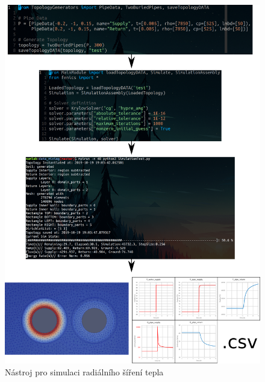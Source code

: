 \begin{figure}[h!]
\begin{center}
  \includegraphics[scale=0.7]{figures/fenics_sim_pipes}
\end{center}
\caption{Nástroj pro simulaci radiálního šíření tepla}
\label{fig:}
\end{figure}

